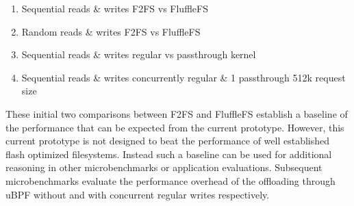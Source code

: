 \begin{enumerate}
    \item Sequential reads \& writes F2FS vs FluffleFS
    \item Random reads \& writes F2FS vs FluffleFS
    \item Sequential reads \& writes regular vs passthrough kernel
    \item Sequential reads \& writes concurrently regular \& 1 passthrough 512k
    request size
\end{enumerate}

These initial two comparisons between F2FS and FluffleFS establish a baseline of
the performance that can be expected from the current prototype. However, this
current prototype is not designed to beat the performance of well established
flash optimized filesystems. Instead such a baseline can be used for additional
reasoning in other microbenchmarks or application evaluations. Subsequent
microbenchmarks evaluate the performance overhead of the offloading through
uBPF without and with concurrent regular writes respectively.

